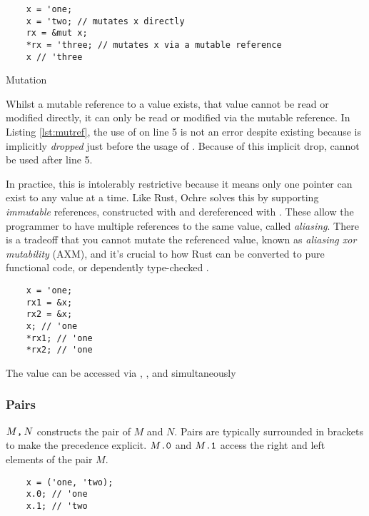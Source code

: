 \documentclass[12pt,twoside]{report}
\begin{document}
\begin{listing}[H]
  \begin{verbatim}
    x = 'one;
    x = 'two; // mutates x directly
    rx = &mut x;
    *rx = 'three; // mutates x via a mutable reference
    x // 'three
  \end{verbatim}
  \caption{Mutation}
  \label{lst:mutref}
\end{listing}

Whilst a mutable reference to a value exists, that value cannot be read or modified directly, it can only be read or modified via the mutable reference. In Listing \ref{lst:mutref}, the use of  on line 5 is not an error despite  existing because is implicitly \textit{dropped} just before the usage of . Because of this implicit drop,  cannot be used after line 5.

In practice, this is intolerably restrictive because it means only one pointer can exist to any value at a time. Like Rust, Ochre solves this by supporting \textit{immutable} references, constructed with \mono{\&} and dereferenced with \mono{*}. These allow the programmer to have multiple references to the same value, called \textit{aliasing}. There is a tradeoff that you cannot mutate the referenced value, known as \textit{aliasing xor mutability} (AXM), and it's crucial to how Rust can be converted to pure functional code, or dependently type-checked \citep{aeneas,ullrichKhaElectrolysis2024}.

\begin{listing}[H]
  \begin{verbatim}
    x = 'one;
    rx1 = &x;
    rx2 = &x;
    x; // 'one
    *rx1; // 'one
    *rx2; // 'one
  \end{verbatim}
  \caption{The value  can be accessed via , , and  simultaneously}
  \label{lst:immref}
\end{listing}

\subsubsection{Pairs}
$M \text{\texttt{,}} \, N$ constructs the pair of $M$ and $N$. Pairs are typically surrounded in brackets to make the precedence explicit. $ M\text{\texttt{.0}} $ and $ M\text{\texttt{.1}} $ access the right and left elements of the pair $M$.

  \begin{verbatim}
    x = ('one, 'two);
    x.0; // 'one
    x.1; // 'two
  \end{verbatim}
\end{document}
